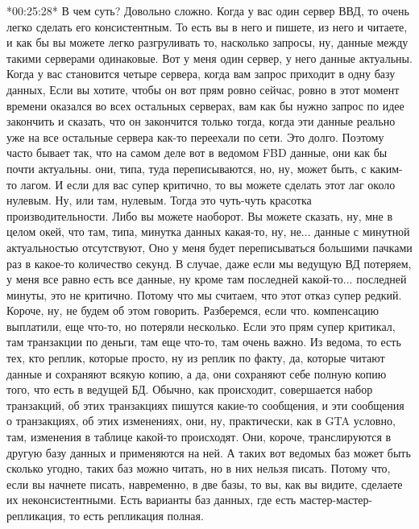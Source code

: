 \documentclass[12pt]{article} %
\begin{document}
*00:25:28*
В чем суть? Довольно сложно.  Когда у вас один сервер ВВД, то очень легко сделать его консистентным.  То есть вы в него и пишете, из него и читаете, и как бы вы можете легко разгруливать то, насколько запросы, ну, данные между такими серверами одинаковые.  Вот у меня один сервер, у него данные актуальны.  Когда у вас становится четыре сервера, когда вам запрос приходит в одну базу данных, Если вы хотите, чтобы он вот прям ровно сейчас, ровно в этот момент времени оказался во всех остальных серверах, вам как бы нужно запрос по идее закончить и сказать, что он закончится только тогда, когда эти данные реально уже на все остальные сервера как-то переехали по сети.  Это долго.  Поэтому часто бывает так, что на самом деле вот в ведомом FBD данные, они как бы почти актуальны.  они, типа, туда переписываются, но, ну, может быть, с каким-то лагом.  И если для вас супер критично, то вы можете сделать этот лаг около нулевым.  Ну, или там, нулевым. Тогда это чуть-чуть красотка производительности.  Либо вы можете наоборот. Вы можете сказать, ну, мне в целом окей, что там, типа, минутка данных какая-то, ну, не... данные с минутной актуальностью отсутствуют, Оно у меня будет переписываться большими пачками раз в какое-то количество секунд.  В случае, даже если мы ведущую ВД потеряем, у меня все равно есть все данные, ну кроме там последней какой-то...  последней минуты, это не критично. Потому что мы считаем, что этот отказ супер редкий.  Короче, ну, не будем об этом говорить. Разберемся, если что.  компенсацию выплатили, еще что-то, но потеряли несколько.  Если это прям супер критикал, там транзакции по деньги, там еще что-то, там очень важно.  Из ведома, то есть тех, кто реплик, которые просто, ну из реплик по факту, да, которые читают данные и сохраняют всякую копию, а да, они сохраняют себе полную копию того, что есть в ведущей БД.  Обычно, как происходит, совершается набор транзакций, об этих транзакциях пишутся какие-то сообщения, и эти сообщения о транзакциях, об этих изменениях, они, ну, практически, как в GTA условно, там, изменения в таблице какой-то происходят.  Они, короче, транслируются в другую базу данных и применяются на ней.  А таких вот ведомых баз может быть сколько угодно, таких баз можно читать, но в них нельзя писать.  Потому что, если вы начнете писать, навременно, в две базы, то вы, как вы видите, сделаете их неконсистентными.  Есть варианты баз данных, где есть мастер-мастер-репликация, то есть репликация полная.
\end{document}
